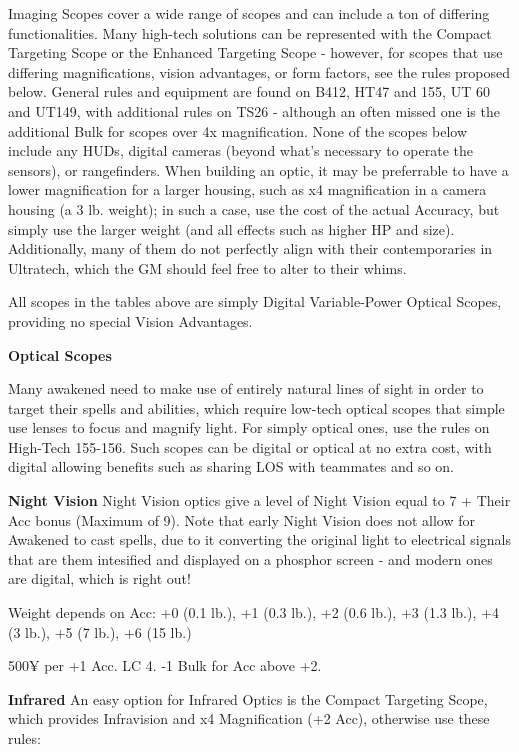 Imaging Scopes cover a wide range of scopes and can include a ton of differing functionalities. Many high-tech solutions can be represented with the Compact Targeting Scope or the Enhanced Targeting Scope - however, for scopes that use differing magnifications, vision advantages, or form factors, see the rules proposed below. General rules and equipment are found on B412, HT47 and 155, UT 60 and UT149, with additional rules on TS26 - although an often missed one is the additional Bulk for scopes over 4x magnification. None of the scopes below include any HUDs, digital cameras (beyond what's necessary to operate the sensors), or rangefinders. When building an optic, it may be preferrable to have a lower magnification for a larger housing, such as x4 magnification in a camera housing (a 3 lb. weight); in such a case, use the cost of the actual Accuracy, but simply use the larger weight (and all effects such as higher HP and size). Additionally, many of them do not perfectly align with their contemporaries in Ultratech, which the GM should feel free to alter to their whims.

All scopes in the tables above are simply Digital Variable-Power Optical Scopes, providing no special Vision Advantages.

\textbf{Optical Scopes}

Many awakened need to make use of entirely natural lines of sight in order to target their spells and abilities, which require low-tech optical scopes that simple use lenses to focus and magnify light. For simply optical ones, use the rules on High-Tech 155-156. Such scopes can be digital or optical at no extra cost, with digital allowing benefits such as sharing LOS with teammates and so on.

\textbf{Night Vision}
Night Vision optics give a level of Night Vision equal to 7 + Their Acc bonus (Maximum of 9).  Note that early Night Vision does not allow for Awakened to cast spells, due to it converting the original light to electrical signals that are them intesified and displayed on a phosphor screen - and modern ones are digital, which is right out!

Weight depends on Acc: +0 (0.1 lb.), +1 (0.3 lb.), +2 (0.6 lb.), +3 (1.3 lb.), +4 (3 lb.), +5 (7 lb.), +6 (15 lb.)

500¥ per +1 Acc. LC 4. -1 Bulk for Acc above +2.

\textbf{Infrared}
An easy option for Infrared Optics is the Compact Targeting Scope, which provides Infravision and x4 Magnification (+2 Acc), otherwise use these rules:

